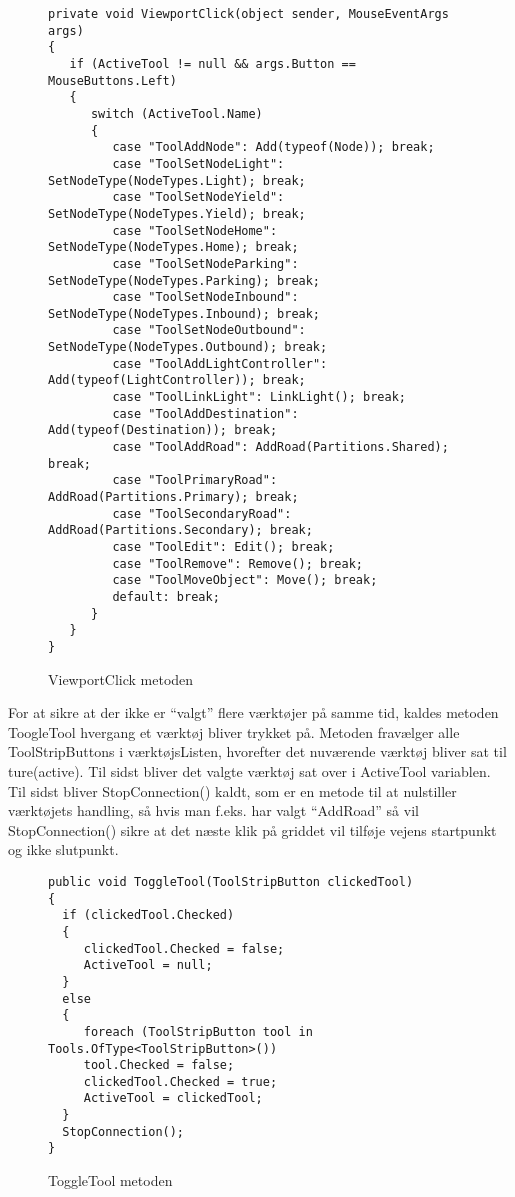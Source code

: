 \begin{figure}[H]
\begin{lstlisting}
private void ViewportClick(object sender, MouseEventArgs args)
{
   if (ActiveTool != null && args.Button == MouseButtons.Left)
   {
      switch (ActiveTool.Name)
      {
         case "ToolAddNode": Add(typeof(Node)); break;
         case "ToolSetNodeLight": SetNodeType(NodeTypes.Light); break;
         case "ToolSetNodeYield": SetNodeType(NodeTypes.Yield); break;
         case "ToolSetNodeHome": SetNodeType(NodeTypes.Home); break;
         case "ToolSetNodeParking": SetNodeType(NodeTypes.Parking); break;
         case "ToolSetNodeInbound": SetNodeType(NodeTypes.Inbound); break;
         case "ToolSetNodeOutbound": SetNodeType(NodeTypes.Outbound); break;
         case "ToolAddLightController": Add(typeof(LightController)); break;
         case "ToolLinkLight": LinkLight(); break;
         case "ToolAddDestination": Add(typeof(Destination)); break;
         case "ToolAddRoad": AddRoad(Partitions.Shared); break;
         case "ToolPrimaryRoad": AddRoad(Partitions.Primary); break;
         case "ToolSecondaryRoad": AddRoad(Partitions.Secondary); break;
         case "ToolEdit": Edit(); break;
         case "ToolRemove": Remove(); break;
         case "ToolMoveObject": Move(); break;
         default: break;
      }
   }
}
\end{lstlisting}
\caption{ViewportClick metoden}\label{ViewportClickCode}
\end{figure}

\vspace{5mm}

For at sikre at der ikke er “valgt” flere værktøjer på samme tid, kaldes metoden ToogleTool hvergang et værktøj bliver trykket på. Metoden fravælger alle ToolStripButtons i værktøjsListen, hvorefter det nuværende værktøj bliver sat til ture(active). Til sidst bliver det valgte værktøj sat over i ActiveTool variablen. Til sidst bliver StopConnection() kaldt, som er en metode til at nulstiller værktøjets handling, så hvis man f.eks. har valgt “AddRoad” så vil StopConnection() sikre at det næste klik på griddet vil tilføje vejens startpunkt og ikke slutpunkt.

\begin{figure}[H]
\begin{lstlisting}
public void ToggleTool(ToolStripButton clickedTool)
{
  if (clickedTool.Checked)
  {
     clickedTool.Checked = false;
     ActiveTool = null;
  }
  else
  {
     foreach (ToolStripButton tool in Tools.OfType<ToolStripButton>())
     tool.Checked = false;
     clickedTool.Checked = true;
     ActiveTool = clickedTool;
  }
  StopConnection();
}
\end{lstlisting}
\caption{ToggleTool metoden}\label{ToggleToolCode}
\end{figure}


